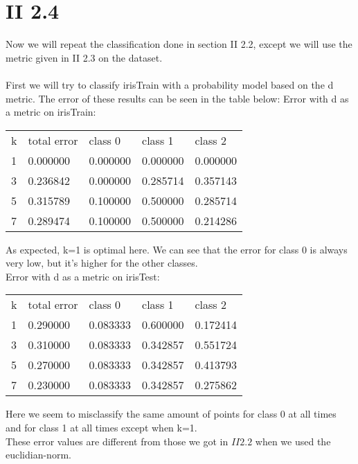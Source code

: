 \documentclass[a4paper,10pt]{article}
\begin{document}
\section{II 2.4}
Now we will repeat the classification done in section II 2.2, except we will
use the metric given in II 2.3 on the dataset.\\
\\
First we will try to classify irisTrain with a probability model based on the
d metric. The error of these results can be seen in the table below:
Error with d as a metric on irisTrain:\\
\begin{center}
\begin{tabular}{l|llll}
 k & total error & class 0 & class 1 & class 2\\
 1 & 0.000000 & 0.000000 & 0.000000 & 0.000000\\
 3 & 0.236842 & 0.000000 & 0.285714 & 0.357143\\
 5 & 0.315789 & 0.100000 & 0.500000 & 0.285714\\
 7 & 0.289474 & 0.100000 & 0.500000 & 0.214286\\
\end{tabular}
\end{center}
As expected, k=1 is optimal here. We can see that the error for class 0 is always very low, but it's higher for the other classes.\\
Error with d as a metric on irisTest:\\
\begin{center}
\begin{tabular}{l|llll}
 k & total error & class 0 & class 1 & class 2\\
 1 & 0.290000 & 0.083333 & 0.600000 & 0.172414\\
 3 & 0.310000 & 0.083333 & 0.342857 & 0.551724\\
 5 & 0.270000 & 0.083333 & 0.342857 & 0.413793\\
 7 & 0.230000 & 0.083333 & 0.342857 & 0.275862\\
\end{tabular}
\end{center}
Here we seem to misclassify the same amount of points for class 0 at all times and for class 1 at all times except when k=1.\\
These error values are different from those we got in $II 2.2$ when we
used the euclidian-norm.\\
\end{document}
